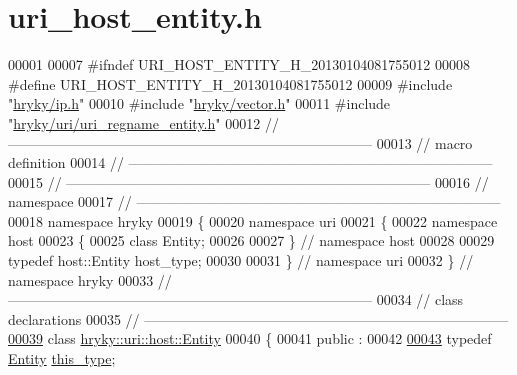 \hypertarget{uri__host__entity_8h_source}{\section{uri\-\_\-host\-\_\-entity.\-h}
}

\begin{DoxyCode}
00001 
00007 \textcolor{preprocessor}{#ifndef URI\_HOST\_ENTITY\_H\_20130104081755012}
00008 \textcolor{preprocessor}{}\textcolor{preprocessor}{#define URI\_HOST\_ENTITY\_H\_20130104081755012}
00009 \textcolor{preprocessor}{}\textcolor{preprocessor}{#include "\hyperlink{ip_8h}{hryky/ip.h}"}
00010 \textcolor{preprocessor}{#include "\hyperlink{vector_8h}{hryky/vector.h}"}
00011 \textcolor{preprocessor}{#include "\hyperlink{uri__regname__entity_8h}{hryky/uri/uri_regname_entity.h}"}
00012 \textcolor{comment}{//
      ------------------------------------------------------------------------------}
00013 \textcolor{comment}{// macro definition}
00014 \textcolor{comment}{//
      ------------------------------------------------------------------------------}
00015 \textcolor{comment}{//
      ------------------------------------------------------------------------------}
00016 \textcolor{comment}{// namespace}
00017 \textcolor{comment}{//
      ------------------------------------------------------------------------------}
00018 \textcolor{keyword}{namespace }hryky
00019 \{
00020 \textcolor{keyword}{namespace }uri
00021 \{
00022 \textcolor{keyword}{namespace }host
00023 \{
00025     \textcolor{keyword}{class }Entity;
00026 
00027 \} \textcolor{comment}{// namespace host}
00028 
00029 \textcolor{keyword}{typedef} host::Entity host\_type;
00030 
00031 \} \textcolor{comment}{// namespace uri}
00032 \} \textcolor{comment}{// namespace hryky}
00033 \textcolor{comment}{//
      ------------------------------------------------------------------------------}
00034 \textcolor{comment}{// class declarations}
00035 \textcolor{comment}{//
      ------------------------------------------------------------------------------}
\hypertarget{uri__host__entity_8h_source_l00039}{}\hyperlink{classhryky_1_1uri_1_1host_1_1_entity}{00039} \textcolor{comment}{}\textcolor{keyword}{class }\hyperlink{classhryky_1_1uri_1_1host_1_1_entity}{hryky::uri::host::Entity}
00040 \{
00041 \textcolor{keyword}{public} :
00042 
\hypertarget{uri__host__entity_8h_source_l00043}{}\hyperlink{classhryky_1_1uri_1_1host_1_1_entity_ac8c50881bac165d457a3aa36480b5158}{00043}     \textcolor{keyword}{typedef} \hyperlink{classhryky_1_1uri_1_1host_1_1_entity}{Entity} \hyperlink{classhryky_1_1uri_1_1host_1_1_entity_ac8c50881bac165d457a3aa36480b5158}{this_type};

\end{DoxyCode}
